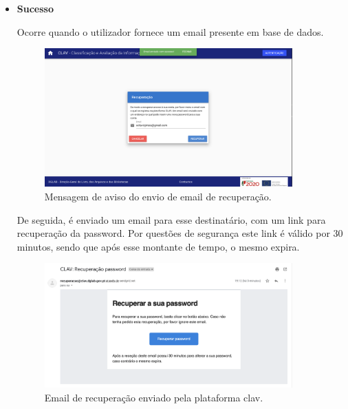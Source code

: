 \vspace{-4mm}
\begin{itemize}
    \item \textbf{Sucesso}
    
    Ocorre quando o utilizador fornece um email presente em base de dados.
    
    \vspace{-4mm}
    \begin{figure}[H]
        \centering
        \includegraphics[width=0.9\textwidth]{img/clav/recuperacao/recuperacaoEnviado.png}
        \caption{Mensagem de aviso do envio de email de recuperação.}
        \label{fig:envioEmailRecuperacao}
    \end{figure}
    
    De seguida, é enviado um email para esse destinatário, com um link para recuperação da password. Por questões de segurança este link é válido por 30 minutos, sendo que após esse montante de tempo, o mesmo expira.
    
    \begin{figure}[H]
        \centering
        \includegraphics[width=0.9\textwidth]{img/clav/recuperacao/email.png}
        \caption{Email de recuperação enviado pela plataforma \gls{clav}.}
        \label{fig:emailRecuperacao}
    \end{figure}
    

\end{itemize}
